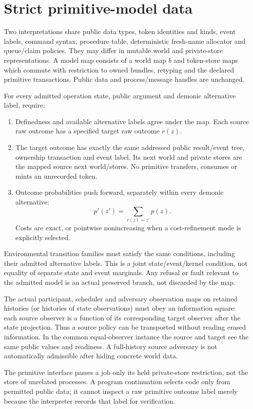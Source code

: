 \documentclass[11pt]{article}
\begin{document}
\section{Strict primitive-model data}
Two interpretations share public data types, token identities and kinds, event labels, command syntax, procedure table, deterministic fresh-name allocator and queue/claim policies. They may differ in mutable world and private-store representations. A model map consists of a world map $b$ and token-store maps which commute with restriction to owned bundles, retyping and the declared primitive transactions. Public data and process/message handles are unchanged.

For every admitted operation state, public argument and demonic alternative label, require:
\begin{enumerate}
\item Definedness and available alternative labels agree under the map. Each source raw outcome has a specified target raw outcome $r(z)$.
\item The target outcome has exactly the same addressed public result/event tree, ownership transaction and event label. Its next world and private stores are the mapped source next world/stores. No primitive transfers, consumes or mints an unrecorded token.
\item Outcome probabilities push forward, separately within every demonic alternative:
\[
 p'(z')=\sum_{r(z)=z'}p(z).
\]
Costs are exact, or pointwise nonincreasing when a cost-refinement mode is explicitly selected.
\end{enumerate}
Environmental transition families must satisfy the same conditions, including their admitted alternative labels. This is a joint state/event/kernel condition, not equality of separate state and event marginals. Any refusal or fault relevant to the admitted model is an actual preserved branch, not discarded by the map.

The actual participant, scheduler and adversary observation maps on retained histories (or histories of state observations) must obey an information square: each source observer is a function of its corresponding target observer after the state projection. Thus a source policy can be transported without reading erased information. In the common equal-observer instance the source and target see the same public values and readiness. A full-history source adversary is not automatically admissible after hiding concrete world data.

The primitive interface passes a job only its held private-store restriction, not the store of unrelated processes. A program continuation selects code only from permitted public data; it cannot inspect a raw primitive outcome label merely because the interpreter records that label for verification.
\end{document}

